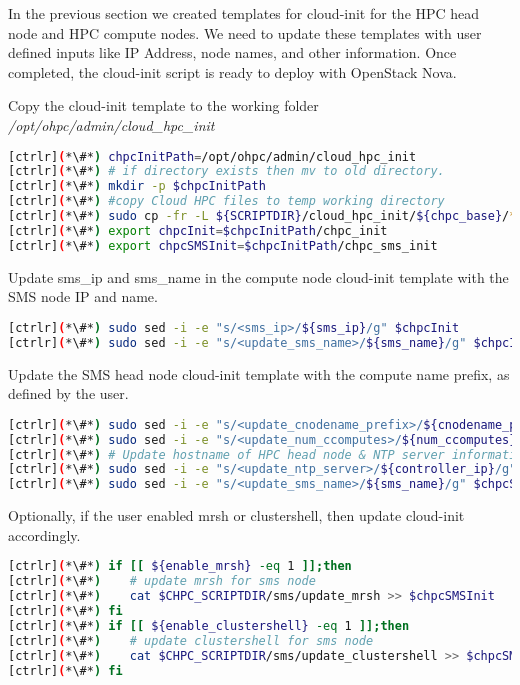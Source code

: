 	In the previous section we created templates for cloud-init for the HPC head node and HPC compute nodes. We need to update these templates with user defined inputs like IP Address, node names, and other information. Once completed, the cloud-init script is ready to deploy with OpenStack Nova.

	Copy the cloud-init template to the working folder {\em /opt/ohpc/admin/cloud\_hpc\_init }


\begin{lstlisting}[language=bash,keywords={}]
[ctrlr](*\#*) chpcInitPath=/opt/ohpc/admin/cloud_hpc_init
[ctrlr](*\#*) # if directory exists then mv to old directory. 
[ctrlr](*\#*) mkdir -p $chpcInitPath
[ctrlr](*\#*) #copy Cloud HPC files to temp working directory
[ctrlr](*\#*) sudo cp -fr -L ${SCRIPTDIR}/cloud_hpc_init/${chpc_base}/* $chpcInitPath
[ctrlr](*\#*) export chpcInit=$chpcInitPath/chpc_init
[ctrlr](*\#*) export chpcSMSInit=$chpcInitPath/chpc_sms_init
\end{lstlisting}

	Update sms\_ip and sms\_name in the compute node cloud-init template with the SMS node IP and name. 
	
\begin{lstlisting}[language=bash,keywords={}]
[ctrlr](*\#*) sudo sed -i -e "s/<sms_ip>/${sms_ip}/g" $chpcInit
[ctrlr](*\#*) sudo sed -i -e "s/<update_sms_name>/${sms_name}/g" $chpcInit
\end{lstlisting}

	Update the SMS head node cloud-init template with the compute name prefix, as defined by the user.

\begin{lstlisting}[language=bash,keywords={}]
[ctrlr](*\#*) sudo sed -i -e "s/<update_cnodename_prefix>/${cnodename_prefix}/g" $chpcSMSInit
[ctrlr](*\#*) sudo sed -i -e "s/<update_num_ccomputes>/${num_ccomputes}/g" $chpcSMSInit
[ctrlr](*\#*) # Update hostname of HPC head node & NTP server information
[ctrlr](*\#*) sudo sed -i -e "s/<update_ntp_server>/${controller_ip}/g" $chpcSMSInit
[ctrlr](*\#*) sudo sed -i -e "s/<update_sms_name>/${sms_name}/g" $chpcSMSInit
\end{lstlisting}

	Optionally, if the user enabled mrsh or clustershell, then update cloud-init accordingly.

\begin{lstlisting}[language=bash,keywords={}]
[ctrlr](*\#*) if [[ ${enable_mrsh} -eq 1 ]];then
[ctrlr](*\#*)    # update mrsh for sms node
[ctrlr](*\#*)    cat $CHPC_SCRIPTDIR/sms/update_mrsh >> $chpcSMSInit
[ctrlr](*\#*) fi
[ctrlr](*\#*) if [[ ${enable_clustershell} -eq 1 ]];then
[ctrlr](*\#*)    # update clustershell for sms node
[ctrlr](*\#*)    cat $CHPC_SCRIPTDIR/sms/update_clustershell >> $chpcSMSInit
[ctrlr](*\#*) fi
\end{lstlisting}

